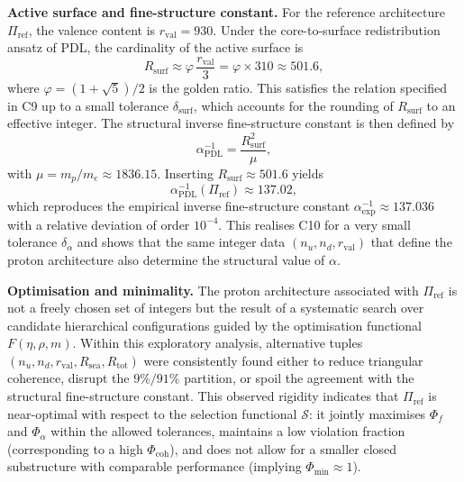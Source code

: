 \documentclass[11pt,a4paper]{article}
\begin{document}
\medskip
\noindent\textbf{Active surface and fine-structure constant.} For the reference architecture $\Pi_{\mathrm{ref}}$, the valence content is $r_{\mathrm{val}}=930$. Under the core-to-surface redistribution ansatz of PDL, the cardinality of the active surface is
\begin{equation}
R_{\mathrm{surf}} \approx \varphi\,\frac{r_{\mathrm{val}}}{3} = \varphi\times 310 \approx 501.6,
\end{equation}
where $\varphi=(1+\sqrt{5})/2$ is the golden ratio.\cite{LaubscherGoldenRatioPDL2026} This satisfies the relation specified in C9 up to a small tolerance $\delta_{\mathrm{surf}}$, which accounts for the rounding of $R_{\mathrm{surf}}$ to an effective integer. The structural inverse fine-structure constant is then defined by
\begin{equation}
\alpha_{\mathrm{PDL}}^{-1} = \frac{R_{\mathrm{surf}}^{2}}{\mu},
\end{equation}
with $\mu=m_p/m_e\approx 1836.15$. Inserting $R_{\mathrm{surf}}\approx 501.6$ yields
\begin{equation}
\alpha_{\mathrm{PDL}}^{-1}(\Pi_{\mathrm{ref}}) \approx 137.02,
\end{equation}
which reproduces the empirical inverse fine-structure constant $\alpha_{\mathrm{exp}}^{-1}\approx 137.036$ with a relative deviation of order $10^{-4}$.\cite{LaubscherDerivationAlpha2026} This realises C10 for a very small tolerance $\delta_{\alpha}$ and shows that the same integer data $(n_u,n_d,r_{\mathrm{val}})$ that define the proton architecture also determine the structural value of $\alpha$.

\medskip
\noindent\textbf{Optimisation and minimality.} The proton architecture associated with $\Pi_{\mathrm{ref}}$ is not a freely chosen set of integers but the result of a systematic search over candidate hierarchical configurations guided by the optimisation functional $F(\eta,\rho,m)$.\cite{LaubscherPDLFull2026,LaubscherIMRadPDL2026} Within this exploratory analysis, alternative tuples $(n_u,n_d,r_{\mathrm{val}},R_{\mathrm{sea}},R_{\mathrm{tot}})$ were consistently found either to reduce triangular coherence, disrupt the $9\%/91\%$ partition, or spoil the agreement with the structural fine-structure constant. This observed rigidity indicates that $\Pi_{\mathrm{ref}}$ is near-optimal with respect to the selection functional $\mathcal{S}$: it jointly maximises $\Phi_f$ and $\Phi_{\alpha}$ within the allowed tolerances, maintains a low violation fraction (corresponding to a high $\Phi_{\mathrm{coh}}$), and does not allow for a smaller closed substructure with comparable performance (implying $\Phi_{\mathrm{min}}\approx 1$).\cite{LaubscherPDLFull2026}
\end{document}
